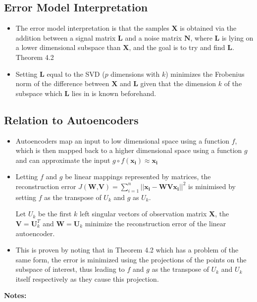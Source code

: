 \documentclass[english]{latex4ei/latex4ei_sheet}
\begin{document}
\begin{sectionbox}
\subsection{Error Model Interpretation}
\begin{itemize}
\item The error model interpretation is that the samples $\boldsymbol{X}$ is obtained via the addition between a signal matrix $\boldsymbol{L}$ and a noise matrix $\boldsymbol{N}$, where $\boldsymbol{L}$ is lying on a lower dimensional subspace than $\boldsymbol{X}$, and the goal is to try and find $\boldsymbol{L}$.
Theorem 4.2
\item Setting $\boldsymbol{L}$ equal to the SVD ($p$ dimensions with $k$) minimizes the Frobenius norm of the difference between $\boldsymbol{X}$ and $\boldsymbol{L}$ given that the dimension $k$ of the subspace which $\boldsymbol{L}$ lies in is known beforehand.
\end{itemize}

\subsection{Relation to Autoencoders}
\begin{itemize}
    \item Autoencoders map an input to low dimensional space using a function $f$, which is then mapped back to a higher dimensional space using a function $g$ and can approximate the input $g\circ f(\boldsymbol{x_i})\approx\boldsymbol{x_i}$
\item Letting $f$ and $g$ be linear mappings represented by matrices, the reconstruction error $J(\textbf{W,V})=\sum_{i=1}^n||\boldsymbol{x_i-WVx_i}||^2$ is minimised by setting $f$ as the transpose of $U_k$ and $g$ as $U_k$.
\begin{emphbox}
    Let \textbf{$U_k$} be the first $k$ left singular vectors of observation matrix \textbf{X}, the $\textbf{V}=\textbf{U}_k^T$ and $\textbf{W}=\textbf{U}_k$ minimize the reconstruction error of the linear autoencoder.
\end{emphbox}
\item This is proven by noting that in Theorem 4.2 which has a problem of the same form, the error is minimized using the projections of the points on the subspace of interest, thus leading to $f$ and $g$ as the transpose of $U_k$ and $U_k$ itself respectively as they cause this projection.

\end{itemize}
\end{sectionbox}
\textbf{Notes:}
\end{document}
